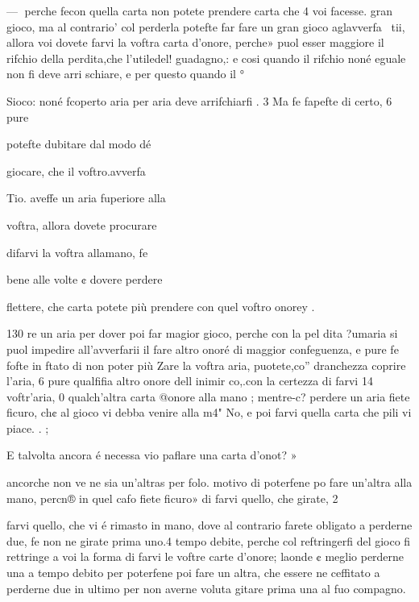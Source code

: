 \documentclass[11pt,a6paper]{article}
\begin{document}
—
perche fecon quella carta non
potete prendere carta che 4 voi
facesse. gran gioco, ma al contrario’ col perderla potefte far
fare un gran gioco aglavverfa~
tii, allora voi dovete farvi la
voftra carta d’onore, perche»
puol esser maggiore il rifchio
della perdita,che l'utiledel! guadagno,: e cosi quando il rifchio
noné eguale non fi deve arri
schiare, e per questo quando il °

Sioco: noné fcoperto aria per
aria deve arrifchiarfi . 3
Ma fe fapefte di certo, 6 pure

potefte dubitare dal modo dé

giocare, che il voftro.avverfa~

Tio. aveffe un aria fuperiore alla

voftra, allora dovete procurare

difarvi la voftra allamano, fe

bene alle volte ¢ dovere perdere

   

flettere, che carta potete più
prendere con quel voftro onorey .
 

 

 

 

 

 

 

130
re un aria per dover poi far magior gioco, perche con la pel
dita ?umaria si puol impedire
all’avverfarii il fare altro onoré
di maggior confeguenza, e pure
fe fofte in ftato di non poter più
Zare la voftra aria, puotete,co”
dranchezza coprire l’aria, 6 pure
qualfifia altro onore dell inimir
co,.con la certezza di farvi 14
voftr’aria, 0 qualch’altra carta
@onore alla mano ; mentre-c?
perdere un aria fiete ficuro, ch¢
al gioco vi debba venire alla m4"
No, e poi farvi quella carta che
pili vi piace. . ;

E talvolta ancora é necessa
vio paflare una carta d’onot? »

ancorche non ve ne sia un’altras
per folo. motivo di poterfene po
fare un’altra alla mano, percn®
in quel cafo fiete ficuro» di
farvi quello, che girate, 2
 

 

farvi quello, che vi é rimasto in
mano, dove al contrario farete
obligato a perderne due, fe non
ne girate prima uno.4 tempo debite, perche col reftringerfi del
gioco fi rettringe a voi la forma
di farvi le voftre carte d’onore;
laonde ¢ meglio perderne una
a tempo debito per poterfene
poi fare un altra, che essere ne
ceffitato a perderne due in ultimo per non averne voluta gitare prima una al fuo compagno.
\end{document}
